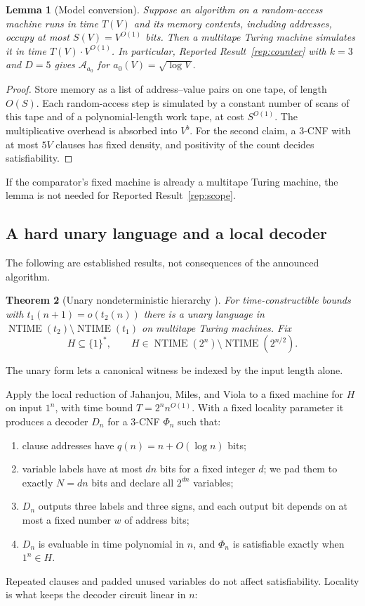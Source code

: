 \documentclass[11pt,reqno]{amsart}
\numberwithin{equation}{section}
\theoremstyle{plain}
\newtheorem{theorem}{Theorem}[section]
\newtheorem{lemma}[theorem]{Lemma}
\theoremstyle{definition}
\theoremstyle{remark}
\newcommand{\NTIME}{\operatorname{NTIME}}
\begin{document}
\begin{lemma}[Model conversion]\label{lem:model}
Suppose an algorithm on a random-access machine runs in time $T(V)$ and its
memory contents, including addresses, occupy at most $S(V)=V^{O(1)}$ bits.
Then a multitape Turing machine simulates it in time $T(V)\cdot V^{O(1)}$.
In particular, Reported Result~\ref{rep:counter} with $k=3$ and $D=5$ gives
$\mathcal A_{a_0}$ for $a_0(V)=\sqrt{\log V}$.
\end{lemma}
\begin{proof}
Store memory as a list of address--value pairs on one tape, of length
$O(S)$. Each random-access step is simulated by a constant number of scans
of this tape and of a polynomial-length work tape, at cost $S^{O(1)}$.
The multiplicative overhead is absorbed into $V^b$. For the second claim,
a 3-CNF with at most $5V$ clauses has fixed density, and positivity of the
count decides satisfiability.
\end{proof}
If the comparator's fixed machine is already a multitape Turing machine, the
lemma is not needed for Reported Result~\ref{rep:scope}.

\subsection{A hard unary language and a local decoder}
The following are established results, not consequences of the announced
algorithm.

\begin{theorem}[Unary nondeterministic hierarchy \cite{Zak,Williams}]
\label{thm:hierarchy}
For time-constructible bounds with $t_1(n+1)=o(t_2(n))$ there is a unary
language in $\NTIME(t_2)\setminus\NTIME(t_1)$ on multitape Turing machines.
Fix
\begin{equation}\label{eq:hard-unary}
 H\subseteq\{1\}^*,\qquad H\in\NTIME(2^n)\setminus\NTIME(2^{n/2}).
\end{equation}
\end{theorem}
The unary form lets a canonical witness be indexed by the input length alone.

Apply the local reduction of Jahanjou, Miles, and Viola
\cite[Theorem~1 and Section~6]{JMV} to a fixed machine for $H$ on input
$1^n$, with time bound $T=2^nn^{O(1)}$. With a fixed locality parameter it
produces a decoder $D_n$ for a 3-CNF $\Phi_n$ such that:
\begin{enumerate}[label=(\roman*)]
\item clause addresses have $q(n)=n+O(\log n)$ bits;
\item variable labels have at most $dn$ bits for a fixed integer $d$; we pad
 them to exactly $N=dn$ bits and declare all $2^{dn}$ variables;
\item $D_n$ outputs three labels and three signs, and each output bit
 depends on at most a fixed number $w$ of address bits;
\item $D_n$ is evaluable in time polynomial in $n$, and $\Phi_n$ is
 satisfiable exactly when $1^n\in H$.
\end{enumerate}
Repeated clauses and padded unused variables do not affect satisfiability.
Locality is what keeps the decoder circuit linear in $n$:
\end{document}
